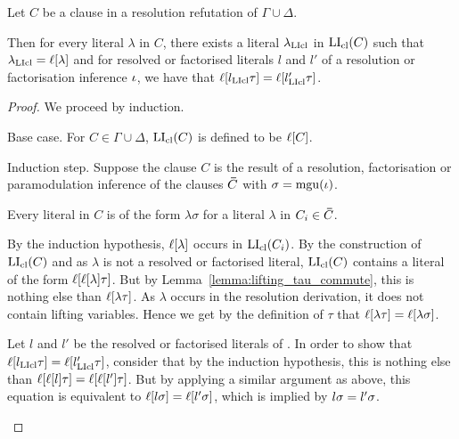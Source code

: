 \documentclass[,%
	draft=false,%
	numbers=noendperiod
	11pt,
	a4paper,
	oneside,%
	openany,
]{memoir}
\begin{document}
\begin{lemma}
	\label{lemma:li_vs_clause_plus_literals_equal}
	Let $C$ be a clause in a resolution refutation of $\Gamma\cup\Delta$.

	Then for every literal $\lambda$ in $C$, there exists a literal $\lambda_{\operatorname{LIcl}}$ in\nolinebreak{} $\operatorname{LI}_{\operatorname{cl}}(C)$ such that $\lambda_{\operatorname{LIcl}} = \ell[\lambda]$ and for resolved or factorised literals $l$ and $l'$ of a resolution or factorisation inference $\iota$, we have that $\ell[l_{\operatorname{LIcl}}\tau] = \ell[l'_{\operatorname{LIcl}}\tau]$.
\end{lemma}
\begin{proof}
	We proceed by induction.
	\begin{description}
		\item{} Base case.
			For $C\in\Gamma\cup\Delta$, $\operatorname{LI}_{\operatorname{cl}}(C)$ is defined to be $\ell[C]$.

		\item{} Induction step.
			Suppose the clause $C$ is the result of a resolution, factorisation or paramodulation inference \inference{} of the clauses $\bm\bar C$ with $\sigma = \operatorname{mgu}(\iota)$.


			Every literal in $C$ is of the form $\lambda\sigma$ for a literal $\lambda$ in $C_i\in\bm\bar C$.

			By the induction hypothesis, $\ell[\lambda]$ occurs in $\operatorname{LI}_{\operatorname{cl}}(C_i)$.
			By the construction of $\operatorname{LI}_{\operatorname{cl}}(C)$ and as $\lambda$ is not a resolved or factorised literal, $\operatorname{LI}_{\operatorname{cl}}(C)$ contains a literal of the form $\ell[\ell[\lambda]\tau]$.
			But by Lemma~\ref{lemma:lifting_tau_commute}, this is nothing else than $\ell[\lambda\tau]$.
			As $\lambda$ occurs in the resolution derivation, it does not contain lifting variables.
			Hence we get by the definition of $\tau$ that $\ell[\lambda\tau] = \ell[\lambda\sigma]$.

			Let $l$ and $l'$ be the resolved or factorised literals of \inference.
			In order to show that $\ell[l_{\operatorname{LIcl}}\tau] = \ell[l'_{\operatorname{LIcl}}\tau]$,
			consider that by the induction hypothesis, this is nothing else than
			$\ell[\ell[l]\tau] = \ell[\ell[l']\tau]$.
			But by applying a similar argument as above, this equation is equivalent to
			$\ell[l\sigma] = \ell[l'\sigma]$, which is implied by $l\sigma =\nolinebreak l'\sigma$.
			\qedhere


\end{description}
\end{proof}
\end{document}
